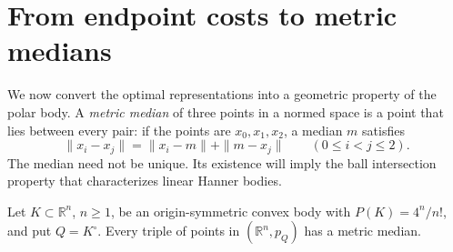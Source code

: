 \section{From endpoint costs to metric medians}\label{sec:median}

We now convert the optimal representations into a geometric property of the polar body. A \emph{metric median} of three points in a normed space is a point that lies between every pair: if the points are $x_0,x_1,x_2$, a median $m$ satisfies
\[
 \|x_i-x_j\|=\|x_i-m\|+\|m-x_j\|
 \qquad(0\le i<j\le2).
\]
The median need not be unique. Its existence will imply the ball intersection property that characterizes linear Hanner bodies.

\begin{proposition}\label{prop:metric-median}
Let $K\subset\mathbb{R}^n$, $n\ge1$, be an origin-symmetric convex body with $P(K)=4^n/n!$, and put $Q=K^\circ$. Every triple of points in $(\mathbb{R}^n,p_Q)$ has a metric median.
\end{proposition}

